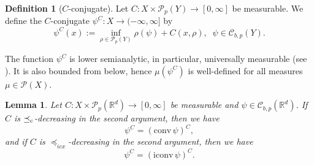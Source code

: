 \documentclass[reqno, a4paper]{amsart}
\newcommand{\lc}{\preceq_{\textnormal{c}}}
\newcommand{\lic}{\preceq_{icx}}
\newtheorem{lemma}[theorem]{Lemma}
\newcommand{\conv}{\mathrm{conv}\,}
\newcommand{\iconv}{\mathrm{iconv}\,}
\newcommand{\PP}{\mathcal{P}}
\newcommand{\R}{\mathbb R}
\theoremstyle{definition}
\newtheorem{definition}[theorem]{Definition}
\theoremstyle{definition}
\theoremstyle{definition}
\begin{document}
\begin{definition}[$C$-conjugate] \label{cconj}
   Let $C:X\times\PP_p(Y)\to[0,\infty]$ be measurable. We define the $C$-conjugate $\psi^C:X\to (-\infty,\infty]$ by
    \begin{equation*}
        \psi^C(x):=\inf_{\rho\in\PP_p(Y)} \rho(\psi)+C(x,\rho), \;\;\psi\in{\mathcal{C}}^{}_{b,p}(Y).
    \end{equation*}
\end{definition}
The function $\psi^C$ is lower semianalytic, in particular, universally measurable (see \cite[Proposition 7.47]{bertsekas1978stochastic}). It is also bounded from below, hence $\mu(\psi^C)$ is well-defined for all measures $\mu\in\PP(X)$.


\begin{lemma} \label{rc stabil lemma}
    Let $C:X\times\PP_p(\R^d)\to[0,\infty]$ be measurable and $\psi\in {\mathcal{C}}_{b,p}(\R^d)$. If $C$ is $\lc$-decreasing in the second argument, then we have $$ \psi^C=({\conv{\psi}})^C,$$
    and if $C$ is $\lic$-decreasing in the second argument, then we have $$ \psi^C=({\iconv{\psi}})^C.$$
\end{lemma}
\end{document}
